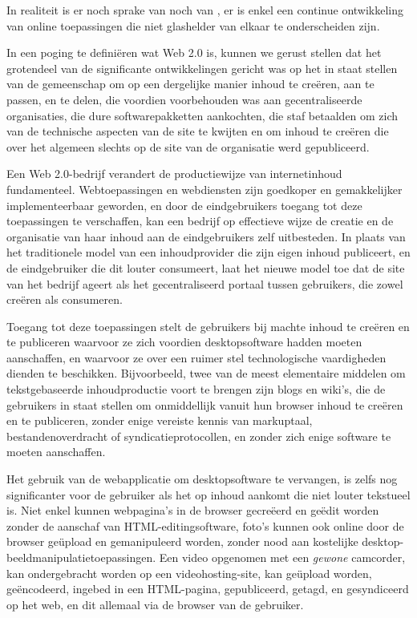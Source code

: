 {In realiteit is er noch sprake van  noch van , er is
enkel een continue ontwikkeling van online toepassingen die niet
glashelder van elkaar te onderscheiden zijn.

In een poging te defini\"eren wat Web 2.0 is, kunnen we gerust stellen
dat het grotendeel van de significante ontwikkelingen gericht was op
het in staat stellen van de gemeenschap om op een dergelijke manier
inhoud te cre\"eren, aan te passen, en te delen, die voordien
voorbehouden was aan gecentraliseerde organisaties, die dure
softwarepakketten aankochten, die staf betaalden om zich van de
technische aspecten van de site te kwijten en om inhoud te cre\"eren
die over het algemeen slechts op de site van de organisatie werd
gepubliceerd.

Een Web 2.0{}-bedrijf verandert de productiewijze van internetinhoud
fundamenteel. Webtoepassingen en webdiensten zijn goedkoper en
gemakkelijker implementeerbaar geworden, en door de eindgebruikers
toegang tot deze toepassingen te verschaffen, kan een bedrijf op
effectieve wijze de creatie en de organisatie van haar inhoud aan de
eindgebruikers zelf uitbesteden. In plaats van het traditionele model
van een inhoudprovider die zijn eigen inhoud publiceert, en de
eindgebruiker die dit louter consumeert, laat het nieuwe model toe dat
de site van het bedrijf ageert als het gecentraliseerd portaal tussen
gebruikers, die zowel cre\"eren als consumeren.

Toegang tot deze toepassingen stelt de gebruikers bij machte inhoud te
cre\"eren en te publiceren waarvoor ze zich voordien desktopsoftware
hadden moeten aanschaffen, en waarvoor ze over een ruimer stel
technologische vaardigheden dienden te beschikken. Bijvoorbeeld, twee
van de meest elementaire middelen om tekstgebaseerde inhoudproductie
voort te brengen zijn blogs en wiki's, die de gebruikers in staat
stellen om onmiddellijk vanuit hun browser inhoud te cre\"eren en te
publiceren, zonder enige vereiste kennis van markuptaal,
bestandenoverdracht of syndicatieprotocollen, en zonder zich enige
software te moeten aanschaffen.

Het gebruik van de webapplicatie om desktopsoftware te vervangen, is
zelfs nog significanter voor de gebruiker als het op inhoud aankomt die
niet louter tekstueel is. Niet enkel kunnen webpagina's in de browser
gecre\"eerd en ge\"edit worden zonder de aanschaf van
HTML{}-editingsoftware, foto's kunnen ook online door de browser
ge\"upload en gemanipuleerd worden, zonder nood aan kostelijke
desktop{}-beeldmanipulatietoepassingen. Een video opgenomen met een
{\em gewone} camcorder, kan ondergebracht worden op een
videohosting{}-site, kan ge\"upload worden, ge\"encodeerd, ingebed in
een HTML{}-pagina, gepubliceerd, getagd, en gesyndiceerd op het web, en
dit allemaal via de browser van de gebruiker.

}
